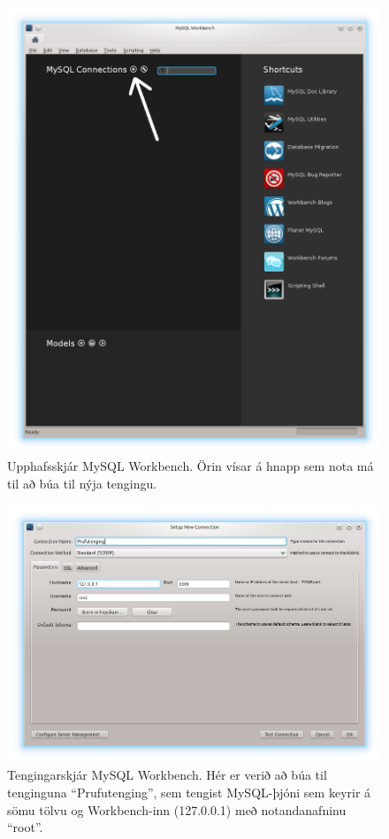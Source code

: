 \begin{figure}
\caption[Upphafsskjár MySQL Workbench]{Upphafsskjár MySQL Workbench. Örin vísar á hnapp sem nota má til að búa til nýja tengingu.}
\label{mynd:workbench-upphafsskjar}
\centering
\includegraphics[width=\linewidth]{myndir/workbench-upphafsskjar-or}
\end{figure}

\begin{figure}
\caption[Tengingarskjár MySQL Workbench]{Tengingarskjár MySQL Workbench. Hér er verið að búa til tenginguna ``Prufutenging'', sem tengist MySQL-þjóni sem keyrir á sömu tölvu og Workbench-inn (127.0.0.1) með notandanafninu ``root''.}
\label{mynd:workbench-login}
\centering
\includegraphics[width=\linewidth]{myndir/workbench-login}
\end{figure}


